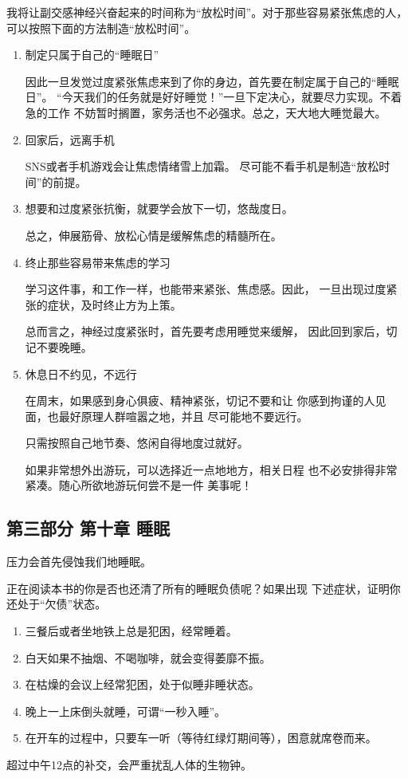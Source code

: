 \documentclass[12pt,a4paper]{article}
\begin{document}
我将让副交感神经兴奋起来的时间称为“放松时间”。对于那些容易紧张焦虑的人，
可以按照下面的方法制造“放松时间”。
\begin{enumerate}
    \item 制定只属于自己的“睡眠日”
    
    因此一旦发觉过度紧张焦虑来到了你的身边，首先要在制定属于自己的“睡眠日”。
    “今天我们的任务就是好好睡觉！”一旦下定决心，就要尽力实现。不着急的工作
    不妨暂时搁置，家务活也不必强求。总之，天大地大睡觉最大。

    \item 回家后，远离手机
    
    SNS或者手机游戏会让焦虑情绪雪上加霜。
    尽可能不看手机是制造“放松时间”的前提。

    \item 想要和过度紧张抗衡，就要学会放下一切，悠哉度日。
    
    总之，伸展筋骨、放松心情是缓解焦虑的精髓所在。

    \item 终止那些容易带来焦虑的学习
    
    学习这件事，和工作一样，也能带来紧张、焦虑感。因此，
    一旦出现过度紧张的症状，及时终止方为上策。

    总而言之，神经过度紧张时，首先要考虑用睡觉来缓解，
    因此回到家后，切记不要晚睡。

    \item 休息日不约见，不远行
    
    在周末，如果感到身心俱疲、精神紧张，切记不要和让
    你感到拘谨的人见面，也最好原理人群喧嚣之地，并且
    尽可能地不要远行。

    只需按照自己地节奏、悠闲自得地度过就好。

    如果非常想外出游玩，可以选择近一点地地方，相关日程
    也不必安排得非常紧凑。随心所欲地游玩何尝不是一件
    美事呢！

\end{enumerate}





\subsection*{第三部分 第十章 睡眠 }

压力会首先侵蚀我们地睡眠。

正在阅读本书的你是否也还清了所有的睡眠负债呢？如果出现
下述症状，证明你还处于“欠债”状态。

\begin{enumerate}
    \item 三餐后或者坐地铁上总是犯困，经常睡着。
    \item 白天如果不抽烟、不喝咖啡，就会变得萎靡不振。
    \item 在枯燥的会议上经常犯困，处于似睡非睡状态。
    \item 晚上一上床倒头就睡，可谓“一秒入睡”。
    \item 在开车的过程中，只要车一听（等待红绿灯期间等），困意就席卷而来。
\end{enumerate}\vspace{-15pt}
{\raggedleft \scriptsize  超过中午12点的补交，会严重扰乱人体的生物钟。\par}
\end{document}
